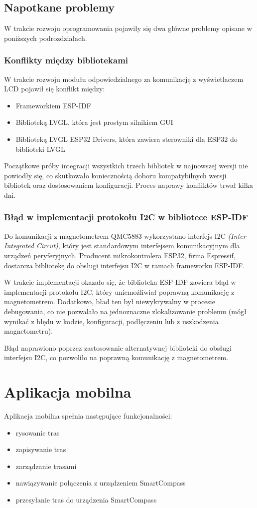 \subsection{Napotkane problemy}
W trakcie rozwoju oprogramowania pojawiły się dwa główne problemy opisane w poniższych podrozdziałach.
\subsubsection{Konflikty między bibliotekami}
W trakcie rozwoju modułu odpowiedzialnego za komunikację z wyświetlaczem LCD pojawił się konflikt między:
\begin{itemize}
    \item Frameworkiem ESP-IDF
    \item Biblioteką LVGL,\cite{lvgl-esp32-port} która jest prostym silnikiem GUI
    \item Biblioteką LVGL ESP32 Drivers, \cite{lvgl-esp32-drivers} która zawiera sterowniki dla ESP32 do biblioteki LVGL
\end{itemize}
Początkowe próby integracji wszystkich trzech bibliotek w najnowszej wersji nie powiodły się,
co skutkowało koniecznością doboru kompatybilnych wersji bibliotek oraz dostosowaniem konfiguracji.
Proces naprawy konfliktów trwał kilka dni.

\subsubsection{Błąd w implementacji protokołu I2C w bibliotece ESP-IDF}
Do komunikacji z magnetometrem QMC5883 wykorzystano interfejs I2C \textit{(Inter Integrated Circut)}, który jest standardowym interfejsem komunikacyjnym dla urządzeń peryferyjnych.
Producent mikrokontrolera ESP32, firma Espressif, dostarcza bibliotekę do obsługi interfejsu I2C w ramach frameworku ESP-IDF.

W trakcie implementacji okazało się, że biblioteka ESP-IDF zawiera błąd w implementacji protokołu I2C, który uniemożliwiał poprawną komunikację z magnetometrem.
Dodatkowo, bład ten był niewykrywalny w procesie debugowania, co nie pozwalało na jednoznaczne zlokalizowanie problemu (mógł wynikać z błędu w kodzie, konfiguracji, podłęczeniu lub z uszkodzenia magnetometru).

Błąd naprawiono poprzez zastosowanie alternatywnej biblioteki do obsługi interfejsu I2C, co pozwoliło na poprawną komunikację z magnetometrem.

\section{Aplikacja mobilna}
Aplikacja mobilna spełnia następujące funkcjonalności:
\begin{itemize}
    \item rysowanie tras
    \item zapisywanie tras
    \item zarządzanie trasami
    \item nawiązywanie połączenia z urządzeniem SmartCompass
    \item przesyłanie tras do urządzenia SmartCompass
\end{itemize}

